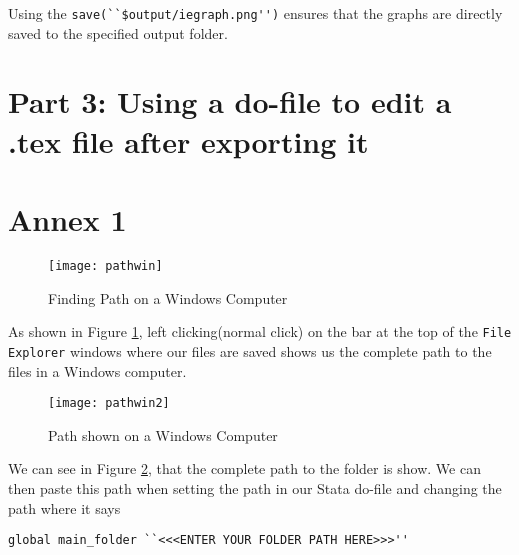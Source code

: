 \documentclass[]{article}
\begin{document}
Using the \verb|save(``$output/iegraph.png'')| ensures that the graphs are directly saved to the specified output folder. 

\section*{Part 3: Using a do-file to edit a .tex file after exporting it}
\newpage
\section*{Annex 1} {\label{annex1}}

\begin{figure}[H]
	\centering
	\texttt{[image: pathwin]}
	\caption{Finding Path on a Windows Computer}
	\label{fig:pathwin}
\end{figure}
As shown in Figure \ref{fig:pathwin}, left clicking(normal click) on the bar at the top of the \texttt{File Explorer} windows where our files are saved shows us the complete path to the files in a Windows computer. \\

\begin{figure}[H]
	\centering
	\texttt{[image: pathwin2]}
	\caption{Path shown on a Windows Computer}
	\label{fig:pathwin2}
\end{figure}

We can see in Figure \ref{fig:pathwin2}, that the complete path to the folder is show. We can then paste this path when setting the path in our Stata do-file and changing the path where it says \begin{verbatim}
global main_folder ``<<<ENTER YOUR FOLDER PATH HERE>>>''
\end{verbatim} 
	
\end{document}
